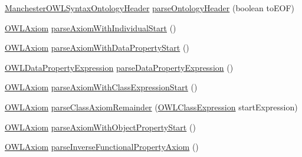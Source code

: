 \begin{DoxyCompactItemize}
\item 
\hyperlink{classorg_1_1coode_1_1owlapi_1_1manchesterowlsyntax_1_1_manchester_o_w_l_syntax_ontology_header}{Manchester\-O\-W\-L\-Syntax\-Ontology\-Header} \hyperlink{classorg_1_1coode_1_1owlapi_1_1manchesterowlsyntax_1_1_manchester_o_w_l_syntax_editor_parser_a19236fc0d67bde112aca821787950d2a}{parse\-Ontology\-Header} (boolean to\-E\-O\-F)
\item 
\hyperlink{interfaceorg_1_1semanticweb_1_1owlapi_1_1model_1_1_o_w_l_axiom}{O\-W\-L\-Axiom} \hyperlink{classorg_1_1coode_1_1owlapi_1_1manchesterowlsyntax_1_1_manchester_o_w_l_syntax_editor_parser_a69df4f7752f45d808920c9e2b121fa03}{parse\-Axiom\-With\-Individual\-Start} ()
\item 
\hyperlink{interfaceorg_1_1semanticweb_1_1owlapi_1_1model_1_1_o_w_l_axiom}{O\-W\-L\-Axiom} \hyperlink{classorg_1_1coode_1_1owlapi_1_1manchesterowlsyntax_1_1_manchester_o_w_l_syntax_editor_parser_a3536570de2e8cd74f475a76cf0f6c85d}{parse\-Axiom\-With\-Data\-Property\-Start} ()
\item 
\hyperlink{interfaceorg_1_1semanticweb_1_1owlapi_1_1model_1_1_o_w_l_data_property_expression}{O\-W\-L\-Data\-Property\-Expression} \hyperlink{classorg_1_1coode_1_1owlapi_1_1manchesterowlsyntax_1_1_manchester_o_w_l_syntax_editor_parser_a70caad98c5a4513f8e2ee8a15e64f20a}{parse\-Data\-Property\-Expression} ()
\item 
\hyperlink{interfaceorg_1_1semanticweb_1_1owlapi_1_1model_1_1_o_w_l_axiom}{O\-W\-L\-Axiom} \hyperlink{classorg_1_1coode_1_1owlapi_1_1manchesterowlsyntax_1_1_manchester_o_w_l_syntax_editor_parser_a0d7099b3ce0454e0d49ebb9d5ab88e2b}{parse\-Axiom\-With\-Class\-Expression\-Start} ()
\item 
\hyperlink{interfaceorg_1_1semanticweb_1_1owlapi_1_1model_1_1_o_w_l_axiom}{O\-W\-L\-Axiom} \hyperlink{classorg_1_1coode_1_1owlapi_1_1manchesterowlsyntax_1_1_manchester_o_w_l_syntax_editor_parser_a70ea4cce5e9870d06cffea9bef5fe329}{parse\-Class\-Axiom\-Remainder} (\hyperlink{interfaceorg_1_1semanticweb_1_1owlapi_1_1model_1_1_o_w_l_class_expression}{O\-W\-L\-Class\-Expression} start\-Expression)
\item 
\hyperlink{interfaceorg_1_1semanticweb_1_1owlapi_1_1model_1_1_o_w_l_axiom}{O\-W\-L\-Axiom} \hyperlink{classorg_1_1coode_1_1owlapi_1_1manchesterowlsyntax_1_1_manchester_o_w_l_syntax_editor_parser_ab8003ef28a261cca62052adf8b399b95}{parse\-Axiom\-With\-Object\-Property\-Start} ()
\item 
\hyperlink{interfaceorg_1_1semanticweb_1_1owlapi_1_1model_1_1_o_w_l_axiom}{O\-W\-L\-Axiom} \hyperlink{classorg_1_1coode_1_1owlapi_1_1manchesterowlsyntax_1_1_manchester_o_w_l_syntax_editor_parser_a6688480273ec45402563d03aca2d6017}{parse\-Inverse\-Functional\-Property\-Axiom} ()

\end{DoxyCompactItemize}
